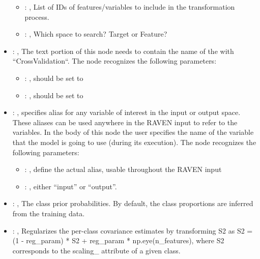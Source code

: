 \begin{itemize}
\begin{itemize}
        \item {}: , 
          List of IDs of features/variables to include in the transformation process.

        \item {}: , 
          Which space to search? Target or Feature?
      \end{itemize}

    \item {}: , 
      The text portion of this node needs to contain the name of the  with
               ``CrossValidation``.
      The  node recognizes the following parameters:
        \begin{itemize}
          \item {}: , 
            should be set to 
          \item {}: , 
            should be set to 
      \end{itemize}

    \item {}: , 
      specifies alias for         any variable of interest in the input or output space. These
      aliases can be used anywhere in the RAVEN input to         refer to the variables. In the body
      of this node the user specifies the name of the variable that the model is going to use
      (during its execution).
      The  node recognizes the following parameters:
        \begin{itemize}
          \item {}: , 
            define the actual alias, usable throughout the RAVEN input
          \item {}: , 
            either ``input'' or ``output''.
      \end{itemize}

    \item {}: , 
      The class prior probabilities. By default, the class
      proportions are inferred from the training data.

    \item {}: , 
      Regularizes the per-class covariance estimates by transforming
      S2 as S2 = (1 - reg\_param) * S2 + reg\_param * np.eye(n\_features),
      where S2 corresponds to the                                                  scaling\_
      attribute of a given class.


\end{itemize}
